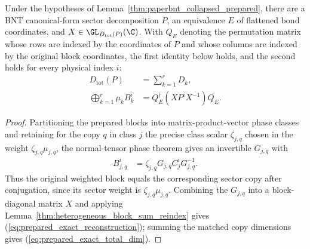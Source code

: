 \begin{lemma}%
    \label{thm:paperbnt_supplier_prepared_exact}
    \leanok
    Under the hypotheses of
    Lemma~\ref{thm:paperbnt_collapsed_prepared}, there are a BNT
    canonical-form sector decomposition $P$, an equivalence $E$ of flattened
    bond coordinates, and $X\in\GL_{D_{\mathrm{tot}}(P)}(\C)$. With $Q_E$
    denoting the permutation matrix whose rows are indexed by the coordinates
    of $P$ and whose columns are indexed by the original block coordinates, the
    first identity below holds, and the second holds for every physical
    index $i$:
    \begin{align}
        D_{\mathrm{tot}}(P) & =\sum_{k=1}^{r}D_k,
        \label{eq:prepared_exact_total_dim}                           \\
        \bigoplus_{k=1}^{r}\mu_kB_k^i
                            & =Q_E^\dagger\left(XP^iX^{-1}\right)Q_E.
        \label{eq:prepared_exact_reconstruction}
    \end{align}
\end{lemma}

\begin{proof}\leanok
    Partitioning the prepared blocks into matrix-product-vector phase classes
    and retaining for the copy $q$ in class $j$ the precise class scalar
    $\zeta_{j,q}$ chosen in the weight $\zeta_{j,q}\mu_{j,q}$, the
    normal-tensor phase theorem gives an invertible $G_{j,q}$ with
    \begin{align}
        B_{j,q}^i & =\zeta_{j,q}G_{j,q}C_j^iG_{j,q}^{-1}.
        \label{eq:prepared_exact_copy_gauge}
    \end{align}
    Thus the original weighted block equals the corresponding sector copy after
    conjugation, since its sector weight is
    $\zeta_{j,q}\mu_{j,q}$. Combining the $G_{j,q}$ into a block-diagonal
    matrix $X$ and applying
    Lemma~\ref{thm:heterogeneous_block_sum_reindex} gives
    (\ref{eq:prepared_exact_reconstruction}); summing the matched copy
    dimensions gives (\ref{eq:prepared_exact_total_dim}).
\end{proof}

